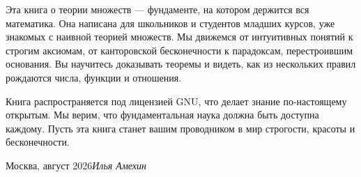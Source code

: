 \foreword

Эта книга о теории множеств — фундаменте, на котором держится вся математика. Она написана для школьников и студентов младших курсов, уже знакомых с наивной теорией множеств. Мы движемся от интуитивных понятий к строгим аксиомам, от канторовской бесконечности к парадоксам, перестроившим основания. Вы научитесь доказывать теоремы и видеть, как из нескольких правил рождаются числа, функции и отношения.

Книга распространяется под лицензией GNU, что делает знание по-настоящему открытым. Мы верим, что фундаментальная наука должна быть доступна каждому. Пусть эта книга станет вашим проводником в мир строгости, красоты и бесконечности.

\vspace{\baselineskip}
\begin{flushright}\noindent
Москва, август 2026\hfill {\it Илья  Амехин}\\
\end{flushright}


